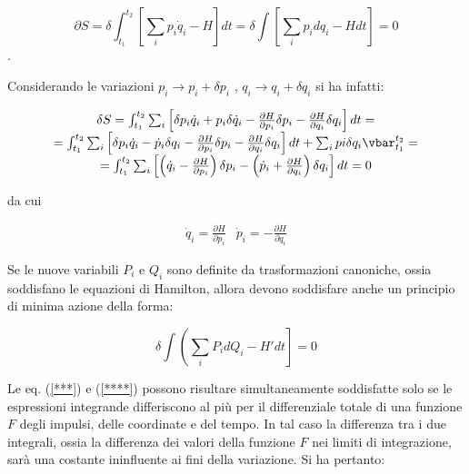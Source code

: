 \documentclass[a4paper,12pt,oneside]{book}
\begin{document}
\begin{equation}
\partial S = \delta \int_{t_1}^{t_2} \left[ \sum_i p_i \dot{q}_i - H \right] dt = \delta \int \left[ \sum_i p_i dq_i - Hdt \right] = 0
\label{***}
\end{equation}.

Considerando le variazioni $p_i \rightarrow p_i + \delta p_i$ , $q_i \rightarrow q_i + \delta q_i$ si ha infatti:

\begin{equation}
\begin{matrix}

\delta S = \int_{t_1}^{t_2} \sum_i \left[ \delta p_i \dot{q}_i + p_i \delta \dot{q}_i - \frac{\partial H}{\partial p_i} \delta p_i - \frac{\partial H}{\partial q_i}\delta q_i \right] dt = \\

= \int_{t_1}^{t_2} \sum_i \left[\delta p_i \dot{q}_i - \dot{p}_i \delta q_i - \frac{\partial H}{\partial p_i} \delta p_i - \frac{\partial H }{\partial q_i} \delta q_i \right] dt + \sum_i pi \delta q_i \vbar_{t_1}^{t_2} = \\

= \int_{t_1}^{t_2} \sum_i \left[ \left( \dot{q}_i - \frac{\partial H}{\partial p_i} \right) \delta p_i - \left( \dot{p}_i + \frac{\partial H}{\partial q_i}\right)\delta q_i \right] dt = 0

\end{matrix}
\end{equation}

da cui

\begin{equation}
\begin{matrix}
\dot{q}_i = \frac{\partial H}{\partial p_i} & \dot{p}_i = - \frac{\partial H}{\partial q_i}
\end{matrix}
\end{equation}

Se le nuove variabili $P_i$ e $Q_i$ sono definite da trasformazioni canoniche, ossia soddisfano le equazioni di Hamilton, allora devono soddisfare anche un principio di minima azione della forma:

\begin{equation}
\delta \int \left( \sum_i P_i dQ_i - H'dt\right] = 0
\label{****}
\end{equation}

Le eq. (\ref{***}) e (\ref{****}) possono risultare simultaneamente soddisfatte solo se le espressioni integrande differiscono al pi\`u per il differenziale totale di una funzione $F$ degli impulsi, delle coordinate e del tempo. In tal caso la differenza tra i due integrali, ossia la differenza dei valori della funzione $F$ nei limiti di integrazione, sar\`a una costante ininfluente ai fini della variazione. Si ha pertanto:
\end{document}
